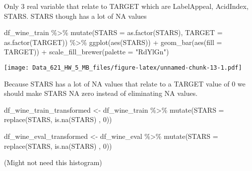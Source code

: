 \documentclass[
]{article}
\newenvironment{Shaded}{\begin{snugshade}}{\end{snugshade}}
\newcommand{\AttributeTok}[1]{\textcolor[rgb]{0.77,0.63,0.00}{#1}}
\newcommand{\CommentTok}[1]{\textcolor[rgb]{0.56,0.35,0.01}{\textit{#1}}}
\newcommand{\DecValTok}[1]{\textcolor[rgb]{0.00,0.00,0.81}{#1}}
\newcommand{\FunctionTok}[1]{\textcolor[rgb]{0.00,0.00,0.00}{#1}}
\newcommand{\NormalTok}[1]{#1}
\newcommand{\OtherTok}[1]{\textcolor[rgb]{0.56,0.35,0.01}{#1}}
\newcommand{\SpecialCharTok}[1]{\textcolor[rgb]{0.00,0.00,0.00}{#1}}
\newcommand{\StringTok}[1]{\textcolor[rgb]{0.31,0.60,0.02}{#1}}
\begin{document}
Only 3 real variable that relate to TARGET which are LabelAppeal,
AcidIndex, STARS. STARS though has a lot of NA values

\begin{Shaded}
\begin{Highlighting}[]
\NormalTok{df\_wine\_train }\SpecialCharTok{\%\textgreater{}\%} 
  \FunctionTok{mutate}\NormalTok{(}\AttributeTok{STARS =} \FunctionTok{as.factor}\NormalTok{(STARS),}
         \AttributeTok{TARGET =} \FunctionTok{as.factor}\NormalTok{(TARGET)) }\SpecialCharTok{\%\textgreater{}\%} 
  \FunctionTok{ggplot}\NormalTok{(}\FunctionTok{aes}\NormalTok{(STARS)) }\SpecialCharTok{+}
  \FunctionTok{geom\_bar}\NormalTok{(}\FunctionTok{aes}\NormalTok{(}\AttributeTok{fill =}\NormalTok{ TARGET)) }\SpecialCharTok{+}
  \FunctionTok{scale\_fill\_brewer}\NormalTok{(}\AttributeTok{palette =} \StringTok{"RdYlGn"}\NormalTok{) }
\end{Highlighting}
\end{Shaded}

\texttt{[image: Data\_621\_HW\_5\_MB\_files/figure-latex/unnamed-chunk-13-1.pdf]}

Because STARS has a lot of NA values that relate to a TARGET value of 0
we should make STARS NA zero instead of eliminating NA values.

\begin{Shaded}
\begin{Highlighting}[]
\NormalTok{df\_wine\_train\_transformed }\OtherTok{\textless{}{-}}\NormalTok{ df\_wine\_train }\SpecialCharTok{\%\textgreater{}\%} 
    \FunctionTok{mutate}\NormalTok{(}\AttributeTok{STARS =} \FunctionTok{replace}\NormalTok{(STARS, }\FunctionTok{is.na}\NormalTok{(STARS) , }\DecValTok{0}\NormalTok{))}

\NormalTok{df\_wine\_eval\_transformed  }\OtherTok{\textless{}{-}}\NormalTok{ df\_wine\_eval }\SpecialCharTok{\%\textgreater{}\%} 
    \FunctionTok{mutate}\NormalTok{(}\AttributeTok{STARS =} \FunctionTok{replace}\NormalTok{(STARS, }\FunctionTok{is.na}\NormalTok{(STARS) , }\DecValTok{0}\NormalTok{))}
\end{Highlighting}
\end{Shaded}

(Might not need this histogram)

\begin{Shaded}
\end{Shaded}
\end{document}
